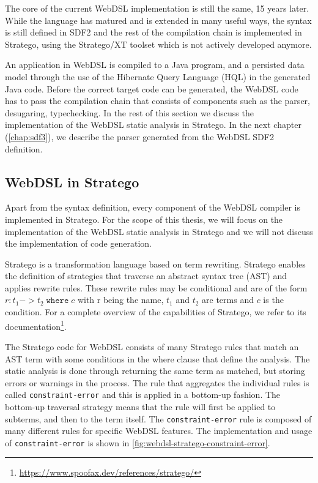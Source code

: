     The core of the current WebDSL implementation is still the same, 15 years later. While the language has matured and is extended in many useful ways, the syntax is still defined in SDF2 and the rest of the compilation chain is implemented in Stratego, using the Stratego/XT toolset which is not actively developed anymore.
    
    An application in WebDSL is compiled to a Java program, and a persisted data model through the use of the Hibernate Query Language (HQL) in the generated Java code. Before the correct target code can be generated, the WebDSL code has to pass the compilation chain that consists of components such as the parser, desugaring, typechecking. In the rest of this section we discuss the implementation of the WebDSL static analysis in Stratego. In the next chapter (\cref{chap:sdf3}), we describe the parser generated from the WebDSL SDF2 definition.

    \subsection{WebDSL in Stratego}

      Apart from the syntax definition, every component of the WebDSL compiler is implemented in Stratego. For the scope of this thesis, we will focus on the implementation of the WebDSL static analysis in Stratego and we will not discuss the implementation of code generation.

      Stratego \autocite{BravenboerDOV06,VisserBT98} is a transformation language based on term rewriting. Stratego enables the definition of strategies that traverse an abstract syntax tree (AST) and applies rewrite rules. These rewrite rules may be conditional and are of the form $r : t_1 -> t_2\;\texttt{where}\;c$ with r being the name, $t_1$ and $t_2$ are terms and $c$ is the condition. For a complete overview of the capabilities of Stratego, we refer to its documentation\footnote{\url{https://www.spoofax.dev/references/stratego/}}.

      The Stratego code for WebDSL consists of many Stratego rules that match an AST term with some conditions in the where clause that define the analysis. The static analysis is done through returning the same term as matched, but storing errors or warnings in the process. The rule that aggregates the individual rules is called \texttt{constraint-error} and this is applied in a bottom-up fashion. The bottom-up traversal strategy means that the rule will first be applied to subterms, and then to the term itself. The \texttt{constraint-error} rule is composed of many different rules for specific WebDSL features. The implementation and usage of \texttt{constraint-error} is shown in \cref{fig:webdsl-stratego-constraint-error}.

